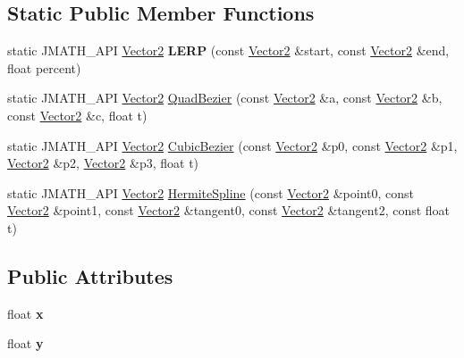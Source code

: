 \subsection*{Static Public Member Functions}
\begin{DoxyCompactItemize}
\item 
\hypertarget{class_vector2_a433e9d84bf9755ea03d5c605a263fbb5}{static J\+M\+A\+T\+H\+\_\+\+A\+P\+I \hyperlink{class_vector2}{Vector2} {\bfseries L\+E\+R\+P} (const \hyperlink{class_vector2}{Vector2} \&start, const \hyperlink{class_vector2}{Vector2} \&end, float percent)}\label{class_vector2_a433e9d84bf9755ea03d5c605a263fbb5}

\item 
static J\+M\+A\+T\+H\+\_\+\+A\+P\+I \hyperlink{class_vector2}{Vector2} \hyperlink{class_vector2_af566992353b8be5b916cf73738ab434b}{Quad\+Bezier} (const \hyperlink{class_vector2}{Vector2} \&a, const \hyperlink{class_vector2}{Vector2} \&b, const \hyperlink{class_vector2}{Vector2} \&c, float t)
\item 
static J\+M\+A\+T\+H\+\_\+\+A\+P\+I \hyperlink{class_vector2}{Vector2} \hyperlink{class_vector2_a8fccc1e668079493e938be9a2b32502c}{Cubic\+Bezier} (const \hyperlink{class_vector2}{Vector2} \&p0, const \hyperlink{class_vector2}{Vector2} \&p1, \hyperlink{class_vector2}{Vector2} \&p2, \hyperlink{class_vector2}{Vector2} \&p3, float t)
\item 
static J\+M\+A\+T\+H\+\_\+\+A\+P\+I \hyperlink{class_vector2}{Vector2} \hyperlink{class_vector2_a0f2095d0321f2562692859119d900a6f}{Hermite\+Spline} (const \hyperlink{class_vector2}{Vector2} \&point0, const \hyperlink{class_vector2}{Vector2} \&point1, const \hyperlink{class_vector2}{Vector2} \&tangent0, const \hyperlink{class_vector2}{Vector2} \&tangent2, const float t)
\end{DoxyCompactItemize}
\subsection*{Public Attributes}
\begin{DoxyCompactItemize}
\item 
\hypertarget{class_vector2_a046bb8d17a876acc49415128dc0502f2}{float {\bfseries x}}\label{class_vector2_a046bb8d17a876acc49415128dc0502f2}

\item 
\hypertarget{class_vector2_a0e07bad05f01ed811b909a2eef97f9e2}{float {\bfseries y}}\label{class_vector2_a0e07bad05f01ed811b909a2eef97f9e2}

\end{DoxyCompactItemize}
